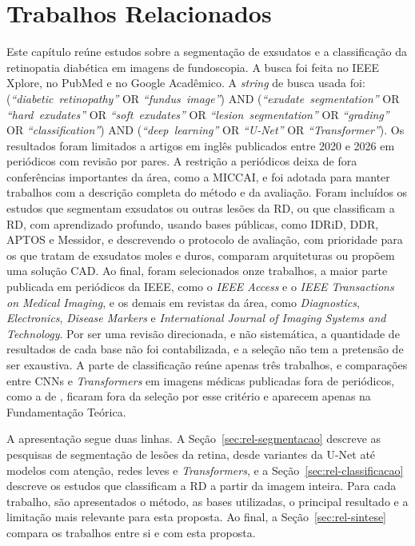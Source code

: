 \chapter{Trabalhos Relacionados}
\label{cap:trabalhos-relacionados}

Este capítulo reúne estudos sobre a segmentação de exsudatos e a classificação da retinopatia diabética em imagens de fundoscopia. A busca foi feita no IEEE Xplore, no PubMed e no Google Acadêmico. A \textit{string} de busca usada foi: (\mbox{\textit{``diabetic retinopathy''}} OR \mbox{\textit{``fundus image''}}) AND (\mbox{\textit{``exudate segmentation''}} OR \mbox{\textit{``hard exudates''}} OR \mbox{\textit{``soft exudates''}} OR \mbox{\textit{``lesion segmentation''}} OR \mbox{\textit{``grading''}} OR \mbox{\textit{``classification''}}) AND (\mbox{\textit{``deep learning''}} OR \mbox{\textit{``U-Net''}} OR \mbox{\textit{``Transformer''}}). Os resultados foram limitados a artigos em inglês publicados entre 2020 e 2026 em periódicos com revisão por pares. A restrição a periódicos deixa de fora conferências importantes da área, como a MICCAI, e foi adotada para manter trabalhos com a descrição completa do método e da avaliação. Foram incluídos os estudos que segmentam exsudatos ou outras lesões da RD, ou que classificam a RD, com aprendizado profundo, usando bases públicas, como IDRiD, DDR, APTOS e Messidor, e descrevendo o protocolo de avaliação, com prioridade para os que tratam de exsudatos moles e duros, comparam arquiteturas ou propõem uma solução CAD. Ao final, foram selecionados onze trabalhos, a maior parte publicada em periódicos da IEEE, como o \textit{IEEE Access} e o \textit{IEEE Transactions on Medical Imaging}, e os demais em revistas da área, como \textit{Diagnostics}, \textit{Electronics}, \textit{Disease Markers} e \textit{International Journal of Imaging Systems and Technology}. Por ser uma revisão direcionada, e não sistemática, a quantidade de resultados de cada base não foi contabilizada, e a seleção não tem a pretensão de ser exaustiva. A parte de classificação reúne apenas três trabalhos, e comparações entre CNNs e \textit{Transformers} em imagens médicas publicadas fora de periódicos, como a de , ficaram fora da seleção por esse critério e aparecem apenas na Fundamentação Teórica.

A apresentação segue duas linhas. A Seção~\ref{sec:rel-segmentacao} descreve as pesquisas de segmentação de lesões da retina, desde variantes da U-Net até modelos com atenção, redes leves e \textit{Transformers}, e a Seção~\ref{sec:rel-classificacao} descreve os estudos que classificam a RD a partir da imagem inteira. Para cada trabalho, são apresentados o método, as bases utilizadas, o principal resultado e a limitação mais relevante para esta proposta. Ao final, a Seção~\ref{sec:rel-sintese} compara os trabalhos entre si e com esta proposta.

